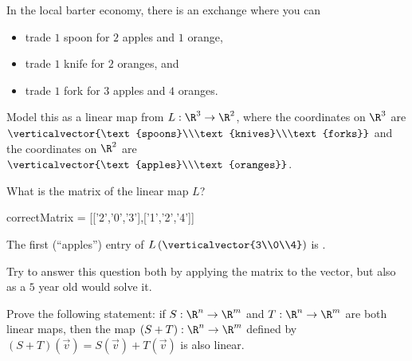 \documentclass{ximera}
\begin{document}
\begin{question}
  In the local barter economy, there is an exchange where you can 
  \begin{itemize}
  \item trade $1$ spoon for $2$ apples and $1$ orange,
  \item trade $1$ knife for $2$ oranges, and
  \item trade $1$ fork for $3$ apples and $4$ oranges.
  \end{itemize}
  Model this as a linear map from $L:\R^3 \to \R^2$, where the coordinates on $\R^3$ are $\verticalvector{\text{spoons}\\\text{knives}\\\text{forks}}$ and the coordinates on $\R^2$ are
  $\verticalvector{\text{apples}\\\text{oranges}}$.

  \begin{solution}
    What is the matrix of the linear map $L$?

    \begin{matrix-answer}[name=w]
      correctMatrix = [['2','0','3'],['1','2','4']]
    \end{matrix-answer}              
  \end{solution}

  \begin{solution}
    The first (``apples'') entry of $L\left(\verticalvector{3\\0\\4}\right)$ is .

    Try to answer this question both by applying the matrix to the
    vector, but also as a $5$ year old would solve it.
  \end{solution}
\end{question} 

Prove the following statement: if $S:\R^n \to\R^m$ and $T:\R^n \to \R^m$ are both linear maps, 
then the map $(S+T):\R^n \to\R^m$ defined by $(S+T)(\vec{v}) = S(\vec{v})+T(\vec{v})$ is also linear.

\begin{free-response}
\end{free-response}


\end{document}
